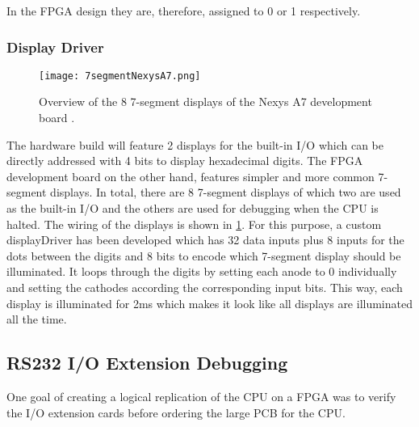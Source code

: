 In the \gls{FPGA} design they are, therefore, assigned to 0 or 1 respectively.

\subsubsection{Display Driver}
\begin{figure}
  \centering
  \texttt{[image: 7segmentNexysA7.png]}
  \caption{Overview of the 8 7-segment displays of the Nexys A7 development board \cite{7segNexys}.}
  \label{fig:7segNexys}
\end{figure}
The hardware build will feature 2 displays for the built-in I/O which can be directly addressed with 4 bits to display hexadecimal digits.
The \gls{FPGA} development board on the other hand, features simpler and more common 7-segment displays.
In total, there are 8 7-segment displays of which two are used as the built-in I/O and the others are used for debugging when the \gls{CPU} is halted.
The wiring of the displays is shown in \cref{fig:7segNexys}.
For this purpose, a custom displayDriver has been developed which has 32 data inputs plus 8 inputs for the dots between the digits and 8 bits to encode which 7-segment display should be illuminated.
It loops through the digits by setting each anode to 0 individually and setting the cathodes according the corresponding input bits.
This way, each display is illuminated for 2ms which makes it look like all displays are illuminated all the time.

\subsection{RS232 I/O Extension Debugging}
One goal of creating a logical replication of the \gls{CPU} on a \gls{FPGA} was to verify the I/O extension cards before ordering the large \gls{PCB} for the \gls{CPU}.
